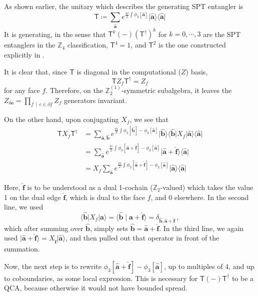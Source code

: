\documentclass[aps,twocolumn,prx,floatfix,preprintnumbers, nofootinbib,10pt]{revtex4-2}
\numberwithin{equation}{section}
\theoremstyle{definition}
\theoremstyle{remark}
\theoremstyle{claim}
\newcommand{\be}{\begin{equation}}
\newcommand{\ee}{\end{equation}}
\newcommand{\Z}{{\mathbb Z}}
\def\bra#1{{\langle{#1}|}}
\def\ket#1{{|{#1}\rangle}}
\renewcommand{\sf}[1]{\mathsf{#1}}
\begin{document}
As shown earlier, the unitary which describes the generating SPT entangler is
\be
\sf{T} \coloneqq \sum_{\bm{\hat{a}}} e^{\frac{\pi i}{2} \int \phi_3[\bm{\hat{a}}]} \ket{\bm{\hat{a}}} \bra{\bm{\hat{a}}}
\ee
It is generating, in the sense that $\sf{T}^k (-) (\sf{T}^\dag)^k$ for $k = 0, \cdots, 3$ are the SPT entanglers in the $\Z_4$ classification, $\sf{T}^4 = 1$, and $\sf{T}^2$ is the one constructed explicitly in \cite{Tsui:2019ykk}.

It is clear that, since $\sf{T}$ is diagonal in the computational ($Z$) basis,
\be
\sf{T} Z_f \sf{T}^\dag = Z_f
\ee
for any face $f$. Therefore, on the $\Z_2^{(1)}$-symmetric subalgebra, it leaves the $Z_{\delta \bm{e}} = \prod_{f \, \mid \, e \in \partial f } Z_f$ generators invariant.

On the other hand, upon conjugating $X_f$, we see that
\begin{align}
\sf{T} X_f \sf{T}^\dag &= \sum_{\bm{\hat{a}},\bm{\hat{b}}} e^{\frac{\pi i}{2} \int \phi_3[\bm{\hat{b}}] - \phi_3[\bm{\hat{a}}]} \ket{\bm{\hat{b}}} \bra{\bm{\hat{b}}} X_f \ket{\bm{\hat{a}}} \bra{\bm{\hat{a}}} \\
&= \sum_{\bm{\hat{a}}} e^{\frac{\pi i}{2} \int \phi_3[\bm{\hat{a}} + \bm{\hat{f}}] - \phi_3[\bm{\hat{a}}]} \ket{\bm{\hat{a}} + \bm{\hat{f}}} \bra{\bm{\hat{a}}} \\
&= X_f \sum_{\bm{\hat{a}}} e^{\frac{\pi i}{2} \int \phi_3[\bm{\hat{a}} + \bm{\hat{f}}] - \phi_3[\bm{\hat{a}}]} \ket{\bm{\hat{a}}} \bra{\bm{\hat{a}}}
\end{align}

Here, $\bm{\hat{f}}$ is to be understood as a dual 1-cochain ($\Z_2$-valued) which takes the value 1 on the dual edge $\bm{\hat{f}}$, which is dual to the face $f$, and 0 elsewhere. In the second line, we used
\be
\bra{\bm{\hat{b}}} X_f \ket{\bm{\hat{a}}} = \langle \bm{\hat{b}} \mid \bm{\hat{a}} + \bm{\hat{f}} \rangle = \delta_{\bm{\hat{b}}, \bm{\hat{a}}+\bm{\hat{f}}} \,,
\ee
which after summing over $\bm{\hat{b}}$, simply sets $\bm{\hat{b}} = \bm{\hat{a}} + \bm{\hat{f}}$. In the third line, we again used $\ket{\bm{\hat{a}} + \bm{\hat{f}}} = X_{\bm{\hat{f}}} \ket{\bm{\hat{a}}}$, and then pulled out that operator in front of the summation.

Now, the next step is to rewrite $\phi_3[\bm{\hat{a}} + \bm{\hat{f}}] - \phi_3[\bm{\hat{a}}]$, up to multiples of 4, and up to coboundaries, as some local expression. This is necessary for $\sf{T} (-) \sf{T}^\dag$ to be a QCA, because otherwise it would not have bounded spread.
\end{document}
